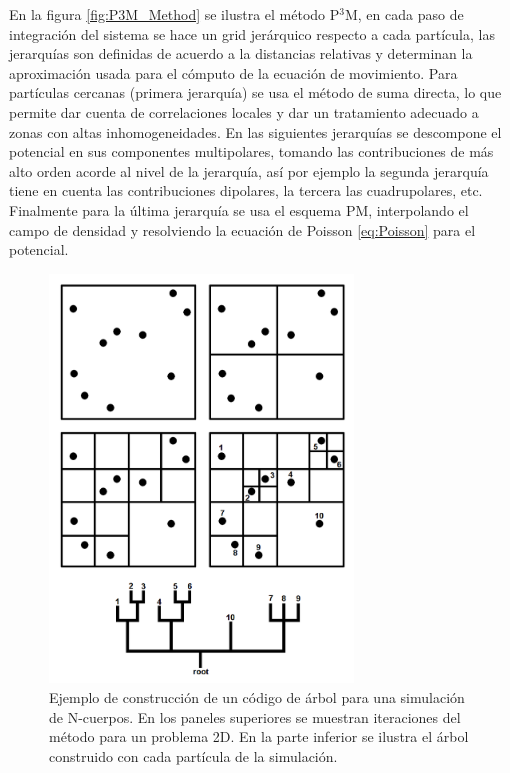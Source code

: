 En la figura \ref{fig:P3M_Method} se ilustra el método P$^3$M, en cada
paso de integración del sistema se hace un grid jerárquico respecto a cada
partícula, las jerarquías son definidas de acuerdo a la distancias 
relativas y determinan la aproximación usada para el cómputo de la 
ecuación de movimiento. Para partículas cercanas (primera jerarquía) se 
usa el método de suma directa, lo que permite dar cuenta de correlaciones
locales y dar un tratamiento adecuado a zonas con altas inhomogeneidades.
En las siguientes jerarquías se descompone el potencial en sus componentes
multipolares, tomando las contribuciones de más alto orden acorde al nivel 
de la jerarquía, así por ejemplo la segunda jerarquía tiene en cuenta las 
contribuciones dipolares, la tercera las cuadrupolares, etc. Finalmente 
para la última jerarquía se usa el esquema PM, interpolando el campo de 
densidad y resolviendo la ecuación de Poisson \ref{eq:Poisson} para el 
potencial.


\begin{figure}[htbp]
	\centering
	\includegraphics[width=0.72\textwidth]
	{./figures/3_nbody_simulations/TreeCode.png}

	\caption{\small{Ejemplo de construcción de un código de árbol para
	una simulación de N-cuerpos. En los paneles superiores se muestran
	iteraciones del método para un problema 2D. En la parte inferior se
	ilustra el árbol construido con cada partícula de la simulación.}}
	
	\label{fig:Tree_Code}
\end{figure}
\newpage

